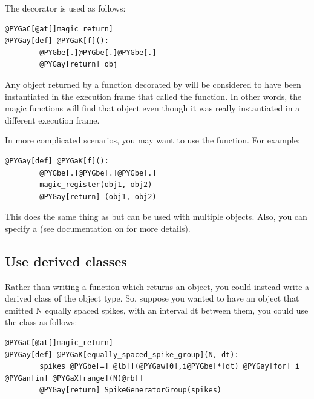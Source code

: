 \documentclass[letterpaper,10pt]{manual}
\begin{document}
The \hyperlink{brian.magic_return}{} decorator is used as follows:

\begin{Verbatim}[commandchars=@\[\]]
@PYGaC[@at[]magic_return]
@PYGay[def] @PYGaK[f]():
        @PYGbe[.]@PYGbe[.]@PYGbe[.]
        @PYGay[return] obj
\end{Verbatim}

Any object returned by a function decorated by \hyperlink{brian.magic_return}{} will be
considered to have been instantiated in the execution frame that called the
function. In other words, the magic functions will find that object even
though it was really instantiated in a different execution frame.

In more complicated scenarios, you may want to use the \hyperlink{brian.magic_register}{}
function. For example:

\begin{Verbatim}[commandchars=@\[\]]
@PYGay[def] @PYGaK[f]():
        @PYGbe[.]@PYGbe[.]@PYGbe[.]
        magic_register(obj1, obj2)
        @PYGay[return] (obj1, obj2)
\end{Verbatim}

This does the same thing as \hyperlink{brian.magic_return}{} but can be used with
multiple objects. Also, you can specify a  (see documentation on
\hyperlink{brian.magic_register}{} for more details).

\subsection{Use derived classes}

Rather than writing a function which returns an object, you could instead
write a derived class of the object type. So, suppose you wanted to have an
object that emitted N equally spaced spikes, with an interval dt between
them, you could use the \hyperlink{brian.SpikeGeneratorGroup}{} class as follows:

\begin{Verbatim}[commandchars=@\[\]]
@PYGaC[@at[]magic_return]
@PYGay[def] @PYGaK[equally_spaced_spike_group](N, dt):
        spikes @PYGbe[=] @lb[](@PYGaw[0],i@PYGbe[*]dt) @PYGay[for] i @PYGan[in] @PYGaX[range](N)@rb[]
        @PYGay[return] SpikeGeneratorGroup(spikes)
\end{Verbatim}
\end{document}
